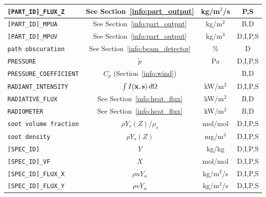 \documentclass[11pt]{book}
\newcommand{\ct}{\tt\small}
\newcommand{\bx}{{\bf x}}
\newcommand{\bs}{{\bf s}}
\newcommand{\tp}{\tilde{p}}
\begin{document}
\begin{table}[h!]
\begin{center}
\begin{tabular}{|l|c|c|c|}
{\ct [PART\_ID]\_FLUX\_Z}                       & See Section~\ref{info:part_output}            & kg/m$^2$/s     & P,S          \\ \hline
{\ct [PART\_ID]\_MPUA}                          & See Section~\ref{info:part_output}            & kg/m$^2$       & B,D          \\ \hline
{\ct [PART\_ID]\_MPUV}                          & See Section~\ref{info:part_output}            & kg/m$^3$       & D,I,P,S      \\ \hline
{\ct path obscuration}                          & See Section~\ref{info:beam_detector}          & \%             & D            \\ \hline
{\ct PRESSURE}                                  & $\tp$                                         & Pa             & D,I,P,S      \\ \hline
{\ct PRESSURE\_COEFFICIENT}                     & $C_p$ (Section~\ref{info:wind})               &                & B,D          \\ \hline
{\ct RADIANT\_INTENSITY}                        & $\int I(\bx,\bs)\, d\Omega$                   & kW/m$^2$       & D,I,P,S      \\ \hline
{\ct RADIATIVE\_FLUX}                           & See Section~\ref{info:heat_flux}              & kW/m$^2$       & B,D          \\ \hline
{\ct RADIOMETER}                                & See Section~\ref{info:heat_flux}              & kW/m$^2$       & B,D          \\ \hline
{\ct soot volume fraction}                      & $\rho Y_s(Z)/\rho_s$                          & mol/mol        & D,I,P,S      \\ \hline
{\ct soot density}                              & $\rho Y_s(Z)$                                 & mg/m$^3$       & D,I,P,S      \\ \hline
{\ct [SPEC\_ID]}                                & $Y$                                           & kg/kg          & D,I,P,S      \\ \hline
{\ct [SPEC\_ID]\_VF}                            & $X$                                           & mol/mol        & D,I,P,S      \\ \hline
{\ct [SPEC\_ID]\_FLUX\_X}                       & $\rho u Y_\alpha$                             & kg/m$^2$/s     & D,I,P,S      \\ \hline
{\ct [SPEC\_ID]\_FLUX\_Y}                       & $\rho v Y_\alpha$                             & kg/m$^2$/s     & D,I,P,S      \\ \hline

\end{tabular}
\end{center}
\end{table}
\end{document}
